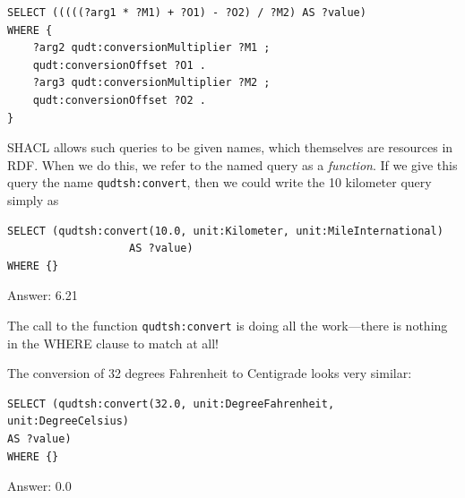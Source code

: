 \begin{lstlisting}
SELECT (((((?arg1 * ?M1) + ?O1) - ?O2) / ?M2) AS ?value)
WHERE {
    ?arg2 qudt:conversionMultiplier ?M1 ;
    qudt:conversionOffset ?O1 .
    ?arg3 qudt:conversionMultiplier ?M2 ;
    qudt:conversionOffset ?O2 .
}
\end{lstlisting}

SHACL allows such queries to be given names, which themselves are
resources in RDF.   When we do this, we refer to the named query 
as a \emph{function}.  If we give this query the 
name \texttt{qudtsh:convert}, then
we could write the 10 kilometer query simply as

\begin{lstlisting}
SELECT (qudtsh:convert(10.0, unit:Kilometer, unit:MileInternational)
                   AS ?value)
WHERE {}
\end{lstlisting}

Answer: 6.21

The call to the function \texttt{qudtsh:convert} is doing all the work---there is
nothing in the
WHERE clause to match at all!

The conversion of 32 degrees Fahrenheit to Centigrade looks very
similar:

\begin{lstlisting}
SELECT (qudtsh:convert(32.0, unit:DegreeFahrenheit,
unit:DegreeCelsius)
AS ?value)
WHERE {}
\end{lstlisting}

Answer: 0.0

